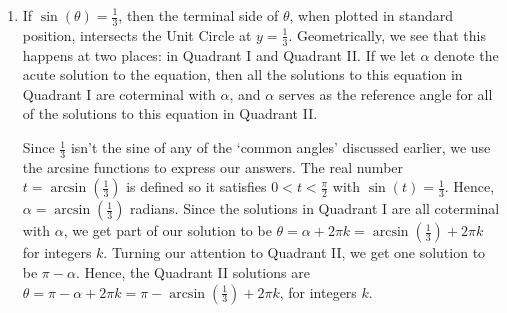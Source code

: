 {
\begin{enumerate}

\item  If $\sin(\theta) = \frac{1}{3}$, then the terminal side of $\theta$, when plotted in standard position, intersects the Unit Circle at $y = \frac{1}{3}$.  Geometrically, we see that this happens at two places:  in Quadrant I and Quadrant II. If we let $\alpha$ denote the acute solution to the equation, then all the solutions to this equation in Quadrant I  are coterminal with $\alpha$, and $\alpha$ serves as the reference angle for all of the solutions to this equation in Quadrant II.


Since $\frac{1}{3}$ isn't the sine of any of the `common angles' discussed earlier, we use the arcsine functions to express our answers.  The real number $t = \arcsin\left(\frac{1}{3}\right)$ is defined so it satisfies $0 < t < \frac{\pi}{2}$ with $\sin(t) = \frac{1}{3}$.  Hence, $\alpha = \arcsin\left(\frac{1}{3}\right)$ radians. Since the solutions in Quadrant I are all coterminal with $\alpha$, we get part of our solution to be $\theta = \alpha + 2\pi k  = \arcsin\left(\frac{1}{3}\right) + 2\pi k$ for integers $k$.  Turning our attention to Quadrant II, we get one solution to be $\pi - \alpha$.  Hence, the Quadrant II solutions are  $\theta = \pi - \alpha + 2\pi k = \pi - \arcsin\left(\frac{1}{3}\right) + 2\pi k$, for integers $k$.



\end{enumerate}}
